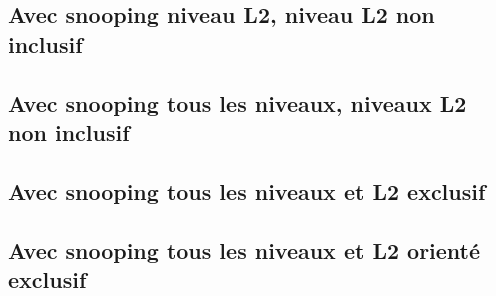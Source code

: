 \documentclass{article}
\begin{document}
\subsection*{Avec snooping niveau L2, niveau L2 non inclusif}

\subsection*{Avec snooping tous les niveaux, niveaux L2 non inclusif}

\subsection*{Avec snooping tous les niveaux et L2 exclusif}

\subsection*{Avec snooping tous les niveaux et L2 orienté exclusif}
\end{document}
